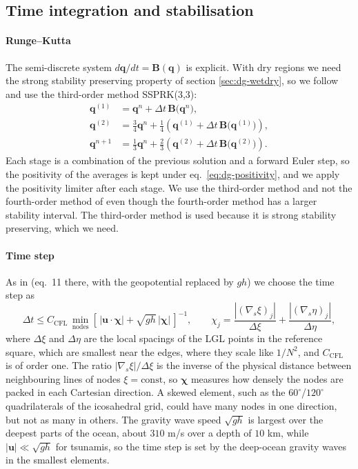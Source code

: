 \subsection{Time integration and stabilisation}\label{sec:dg-time}

\paragraph{Runge--Kutta}
The semi-discrete system $d\mathbf{q}/dt = \mathbf{B}(\mathbf{q})$ is explicit. With dry regions we need the strong stability preserving property of section \ref{sec:dg-wetdry}, so we follow \cite{bonev2018discontinuous} and use the third-order method SSPRK(3,3):
\begin{align*}
    \mathbf{q}^{(1)} &= \mathbf{q}^n + \Delta t\,\mathbf{B}\big(\mathbf{q}^n\big),\\
    \mathbf{q}^{(2)} &= \frac34\mathbf{q}^n + \frac14\left(\mathbf{q}^{(1)} + \Delta t\,\mathbf{B}\big(\mathbf{q}^{(1)}\big)\right),\\
    \mathbf{q}^{n+1} &= \frac13\mathbf{q}^n + \frac23\left(\mathbf{q}^{(2)} + \Delta t\,\mathbf{B}\big(\mathbf{q}^{(2)}\big)\right).
\end{align*}
Each stage is a combination of the previous solution and a forward Euler step, so the positivity of the averages is kept under eq.~\eqref{eq:dg-positivity}, and we apply the positivity limiter after each stage. We use the third-order method and not the fourth-order method of \cite{GIRALDO2002499} even though the fourth-order method has a larger stability interval. The third-order method is used because it is strong stability preserving, which we need.

\paragraph{Time step}
As in \cite{GIRALDO2002499} (eq.~11 there, with the geopotential replaced by $gh$) we choose the time step as
\begin{equation}
    \Delta t \leq C_{\mathrm{CFL}}\,\min_{\text{nodes}}\left[\,|\mathbf{u}\cdot\boldsymbol{\chi}| + \sqrt{gh}\,|\boldsymbol{\chi}|\,\right]^{-1}, \qquad
    \chi_j = \frac{|(\nabla_s\xi)_j|}{\Delta\xi} + \frac{|(\nabla_s\eta)_j|}{\Delta\eta},
\end{equation}
where $\Delta\xi$ and $\Delta\eta$ are the local spacings of the LGL points in the reference square, which are smallest near the edges, where they scale like $1/N^2$, and $C_{\mathrm{CFL}}$ is of order one. The ratio $|\nabla_s\xi|/\Delta\xi$ is the inverse of the physical distance between neighbouring lines of nodes $\xi = \mathrm{const}$, so $\boldsymbol{\chi}$ measures how densely the nodes are packed in each Cartesian direction. A skewed element, such as the $60^\circ$/$120^\circ$ quadrilaterals of the icosahedral grid, could have many nodes in one direction, but not as many in others. The gravity wave speed $\sqrt{gh}$ is largest over the deepest parts of the ocean, about $310$ m/s over a depth of $10$ km, while $|\mathbf{u}|\ll\sqrt{gh}$ for tsunamis, so the time step is set by the deep-ocean gravity waves in the smallest elements.

